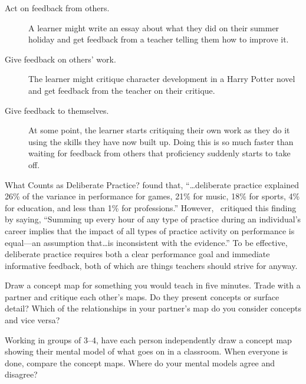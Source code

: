 \begin{description}

\item[Act on feedback from others.]
  A learner might write an essay about what they did on their summer holiday
  and get feedback from a teacher telling them how to improve it.

\item[Give feedback on others' work.]
  The learner might critique character development in a Harry Potter novel
  and get feedback from the teacher on their critique.

\item[Give feedback to themselves.]
  At some point,
  the learner starts critiquing their own work as they do it
  using the skills they have now built up.
  Doing this is so much faster than waiting for feedback from others
  that proficiency suddenly starts to take off.

\end{description}

\begin{aside}{What Counts as Deliberate Practice?}
  \cite{Macn2014} found that,
  ``{\ldots}deliberate practice explained 26\% of the variance in performance for games,
  21\% for music,
  18\% for sports,
  4\% for education,
  and less than 1\% for professions.''
  However,~\cite{Eric2016} critiqued this finding by saying,
  ``Summing up every hour of any type of practice during an individual's career
  implies that the impact of all types of practice activity on performance is equal---an assumption
  that{\ldots}is inconsistent with the evidence.''
  To be effective,
  deliberate practice requires both a clear performance goal
  and immediate informative feedback,
  both of which are things teachers should strive for anyway.
\end{aside}



Draw a concept map for something you would teach in five minutes.
Trade with a partner and critique each other's maps.
Do they present concepts or surface detail?
Which of the relationships in your partner's map do you consider concepts and vice versa?


Working in groups of 3--4,
have each person independently draw a concept map showing their mental model of what goes on in a classroom.
When everyone is done,
compare the concept maps.
Where do your mental models agree and disagree?

